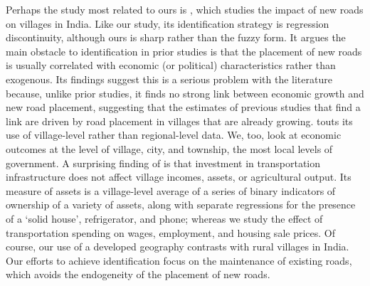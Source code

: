 Perhaps the study most related to ours is \cite{asher2020}, which studies the impact of new roads on villages in India. Like our study, its identification strategy is regression discontinuity, although ours is sharp rather than the fuzzy form.  It argues the main obstacle to identification in prior studies is that the placement of new roads is usually correlated with economic (or political) characteristics rather than exogenous.  Its findings suggest this is a serious problem with the literature because, unlike prior studies, it finds no strong link between economic growth and new road placement, suggesting that the estimates of previous studies that find a link are driven by road placement in villages that are already growing. \cite{asher2020} touts its use of village-level rather than regional-level data.  We, too, look at economic outcomes at the level of village, city, and township, the most local levels of government.  A surprising finding of \cite{asher2020} is that investment in transportation infrastructure does not affect village incomes, assets, or agricultural output.  Its measure of assets is a village-level average of a series of binary indicators of ownership of a variety of assets, along with separate regressions for the presence of a ‘solid house’, refrigerator, and phone; whereas we study the effect of transportation spending on wages, employment, and housing sale prices.  Of course, our use of a developed geography contrasts with rural villages in India.  Our efforts to achieve identification focus on the maintenance of existing roads, which avoids the endogeneity of the placement of new roads.
